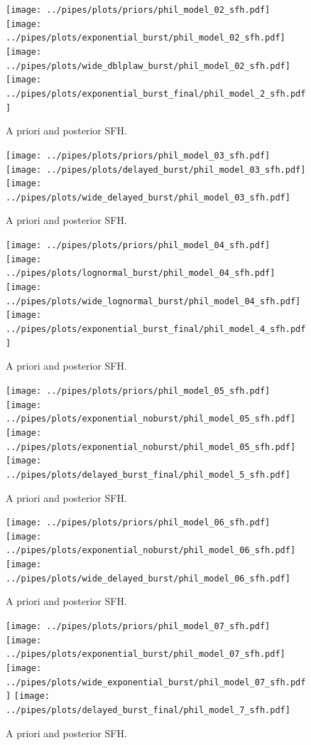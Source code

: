 \documentclass[a4paper,11pt]{article}
\begin{document}
\newpage
\begin{figure}[h!]
  \centering
  \texttt{[image: ../pipes/plots/priors/phil\_model\_02\_sfh.pdf]}
  \texttt{[image: ../pipes/plots/exponential\_burst/phil\_model\_02\_sfh.pdf]}
  \texttt{[image: ../pipes/plots/wide\_dblplaw\_burst/phil\_model\_02\_sfh.pdf]}
  \texttt{[image: ../pipes/plots/exponential\_burst\_final/phil\_model\_2\_sfh.pdf]}
  \caption{A priori and posterior SFH.}
  \label{}
\end{figure}

\newpage
\begin{figure}[h!]
  \centering
  \texttt{[image: ../pipes/plots/priors/phil\_model\_03\_sfh.pdf]}
  \texttt{[image: ../pipes/plots/delayed\_burst/phil\_model\_03\_sfh.pdf]}
  \texttt{[image: ../pipes/plots/wide\_delayed\_burst/phil\_model\_03\_sfh.pdf]}
  \caption{A priori and posterior SFH.}
  \label{}
\end{figure}

\newpage
\begin{figure}[h!]
  \centering
  \texttt{[image: ../pipes/plots/priors/phil\_model\_04\_sfh.pdf]}
  \texttt{[image: ../pipes/plots/lognormal\_burst/phil\_model\_04\_sfh.pdf]}
  \texttt{[image: ../pipes/plots/wide\_lognormal\_burst/phil\_model\_04\_sfh.pdf]}
  \texttt{[image: ../pipes/plots/exponential\_burst\_final/phil\_model\_4\_sfh.pdf]}
  \caption{A priori and posterior SFH.}
  \label{}
\end{figure}

\newpage
\begin{figure}[h!]
  \centering
  \texttt{[image: ../pipes/plots/priors/phil\_model\_05\_sfh.pdf]}
  \texttt{[image: ../pipes/plots/exponential\_noburst/phil\_model\_05\_sfh.pdf]}
  \texttt{[image: ../pipes/plots/exponential\_noburst/phil\_model\_05\_sfh.pdf]}
  \texttt{[image: ../pipes/plots/delayed\_burst\_final/phil\_model\_5\_sfh.pdf]}
  \caption{A priori and posterior SFH.}
  \label{}
\end{figure}

\newpage
\begin{figure}[h!]
  \centering
  \texttt{[image: ../pipes/plots/priors/phil\_model\_06\_sfh.pdf]}
  \texttt{[image: ../pipes/plots/exponential\_noburst/phil\_model\_06\_sfh.pdf]}
  \texttt{[image: ../pipes/plots/wide\_delayed\_burst/phil\_model\_06\_sfh.pdf]}
  \caption{A priori and posterior SFH.}
  \label{}
\end{figure}

\newpage
\begin{figure}[h!]
  \centering
  \texttt{[image: ../pipes/plots/priors/phil\_model\_07\_sfh.pdf]}
  \texttt{[image: ../pipes/plots/exponential\_burst/phil\_model\_07\_sfh.pdf]}
  \texttt{[image: ../pipes/plots/wide\_exponential\_burst/phil\_model\_07\_sfh.pdf]}
  \texttt{[image: ../pipes/plots/delayed\_burst\_final/phil\_model\_7\_sfh.pdf]}
  \caption{A priori and posterior SFH.}
  \label{}
\end{figure}
\end{document}
